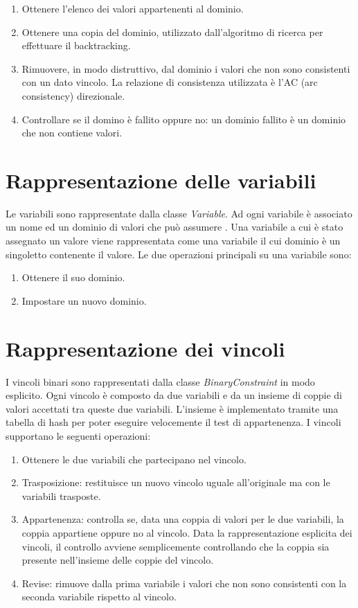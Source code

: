 \documentclass[a4paper,12pt,italian]{article}
\begin{document}
\begin{enumerate}
\item Ottenere l'elenco dei valori appartenenti al dominio.
\item Ottenere una copia del dominio, utilizzato dall'algoritmo di
  ricerca per effettuare il backtracking.
\item Rimuovere, in modo distruttivo, dal dominio i valori che non
  sono consistenti con un dato vincolo. La relazione di consistenza
  utilizzata \`e l'AC (arc consistency) direzionale.
\item Controllare se il domino \`e fallito oppure no: un dominio
  fallito \`e un dominio che non contiene valori.
\end{enumerate}

\section{Rappresentazione delle variabili}

Le variabili sono rappresentate dalla classe \textit{Variable}. Ad
ogni variabile \`e associato un nome ed un dominio di valori che pu\`o
assumere . Una variabile a cui \`e stato assegnato un valore viene
rappresentata come una variabile il cui dominio \`e un singoletto
contenente il valore. Le due operazioni principali su una variabile
sono:
\begin{enumerate}
\item Ottenere il suo dominio.
\item Impostare un nuovo dominio.
\end{enumerate}

\section{Rappresentazione dei vincoli}

I vincoli binari sono rappresentati dalla classe
\textit{BinaryConstraint} in modo esplicito. Ogni vincolo \`e composto
da due variabili e da un insieme di coppie di valori accettati tra
queste due variabili. L'insieme \`e implementato tramite una tabella
di hash per poter eseguire velocemente il test di appartenenza. I
vincoli supportano le seguenti operazioni:

\begin{enumerate}
\item Ottenere le due variabili che partecipano nel vincolo.
\item Trasposizione: restituisce un nuovo vincolo uguale all'originale
  ma con le variabili trasposte.
\item Appartenenza: controlla se, data una coppia di valori per le due variabili, la
  coppia appartiene oppure no al vincolo. Data la rappresentazione
  esplicita dei vincoli, il controllo avviene semplicemente
  controllando che la coppia sia presente nell'insieme delle coppie
  del vincolo.
\item Revise: rimuove dalla prima variabile i valori che non sono
  consistenti con la seconda variabile rispetto al vincolo.
\end{enumerate}
\end{document}
